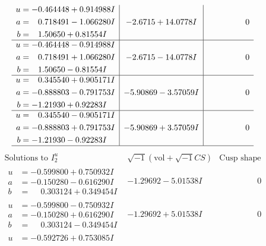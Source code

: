 \documentclass[1p]{elsarticle_modified}
\theoremstyle{definition}
\newcommand{\I}{\sqrt{-1}}
\begin{document}
$$\begin{array}{c|c|c}
\begin{aligned}
u &= -0.464448 + 0.914988 I \\
a &= \phantom{-}0.718491 - 1.066280 I \\
b &= \phantom{-}1.50650 + 0.81554 I\end{aligned}
 & -2.6715 + 14.0778 I & \phantom{-0.000000 } 0 \\ \hline\begin{aligned}
u &= -0.464448 - 0.914988 I \\
a &= \phantom{-}0.718491 + 1.066280 I \\
b &= \phantom{-}1.50650 - 0.81554 I\end{aligned}
 & -2.6715 - 14.0778 I & \phantom{-0.000000 } 0 \\ \hline\begin{aligned}
u &= \phantom{-}0.345540 + 0.905171 I \\
a &= -0.888803 - 0.791753 I \\
b &= -1.21930 + 0.92283 I\end{aligned}
 & -5.90869 - 3.57059 I & \phantom{-0.000000 } 0 \\ \hline\begin{aligned}
u &= \phantom{-}0.345540 - 0.905171 I \\
a &= -0.888803 + 0.791753 I \\
b &= -1.21930 - 0.92283 I\end{aligned}
 & -5.90869 + 3.57059 I & \phantom{-0.000000 } 0\\
 \hline 
 \end{array}$$\newpage$$\begin{array}{c|c|c}  
\text{Solutions to }I^u_{2}& \I (\text{vol} + \sqrt{-1}CS) & \text{Cusp shape}\\
 \hline 
\begin{aligned}
u &= -0.599800 + 0.750932 I \\
a &= -0.150280 - 0.616290 I \\
b &= \phantom{-}0.303124 + 0.349454 I\end{aligned}
 & -1.29692 - 5.01538 I & \phantom{-0.000000 } 0 \\ \hline\begin{aligned}
u &= -0.599800 - 0.750932 I \\
a &= -0.150280 + 0.616290 I \\
b &= \phantom{-}0.303124 - 0.349454 I\end{aligned}
 & -1.29692 + 5.01538 I & \phantom{-0.000000 } 0 \\ \hline\begin{aligned}
u &= -0.592726 + 0.753085 I \\

\end{aligned}
\end{array}$$
\end{document}
